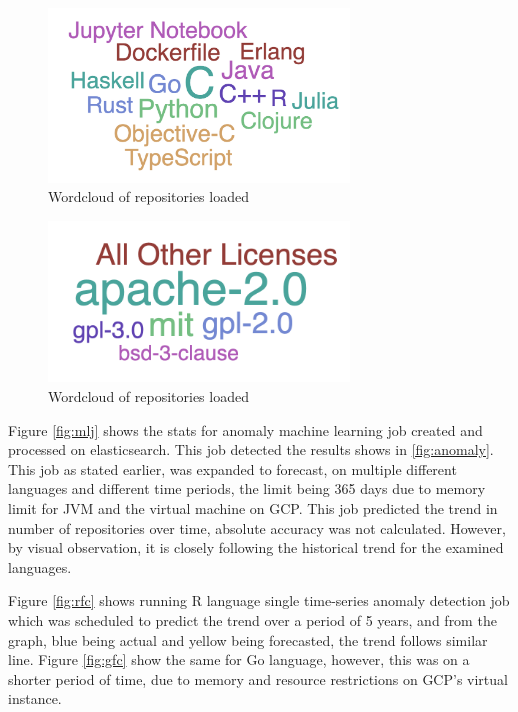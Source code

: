 \documentclass[12pt,conference]{IEEEtran}
\begin{document}
\begin{figure}[h]
  \centering
  \includegraphics[width=8cm]{lang.png}
  \caption{Wordcloud of repositories loaded}
  \label{fig:lang}
\end{figure}

\begin{figure}[h!]
  \centering
  \includegraphics[width=8cm]{lic.png}
  \caption{Wordcloud of repositories loaded}
  \label{fig:licenses}
\end{figure}

Figure \ref{fig:mlj} shows the stats for anomaly machine learning job created and processed on elasticsearch. This job detected the results shows in \ref{fig:anomaly}. This job as stated earlier, was expanded to forecast, on multiple different languages and different time periods, the limit being 365 days due to memory limit for JVM and the virtual machine on GCP. This job predicted the trend in number of repositories over time, absolute accuracy was not calculated. However, by visual observation, it is closely following the historical trend for the examined languages. 

Figure \ref{fig:rfc} shows running R language single time-series anomaly detection job which was scheduled to predict the trend over a period of 5 years, and from the graph, blue being actual and yellow being forecasted, the trend follows similar line. Figure \ref{fig:gfc} show the same for Go language, however, this was on a shorter period of time, due to memory and resource restrictions on GCP's virtual instance. 
\end{document}
